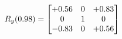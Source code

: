 \documentclass[preview]{standalone}
\begin{document}
\begin{align*}
\special{dvisvgm:raw <g id='unique000'>}R_{y}(0.98) = \begin{bmatrix}+0.56 & 0 & +0.83 \\0 & 1 & 0 \\-0.83 & 0 & +0.56\end{bmatrix}\special{dvisvgm:raw </g>}
\end{align*}
\end{document}
